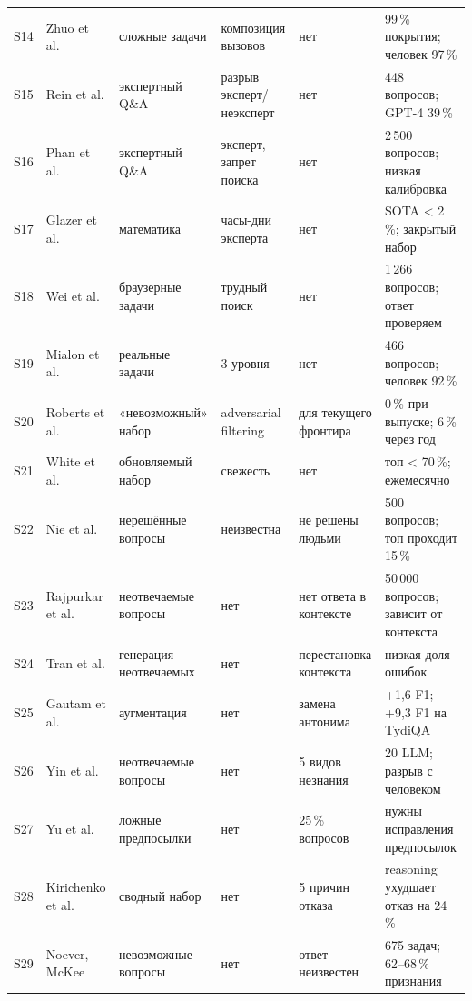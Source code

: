 \documentclass[11pt,a4paper]{article}
\begin{document}
{\begin{longtable}{@{}p{0.65cm}p{2.6cm}p{2.6cm}p{2.9cm}p{2.9cm}p{2.7cm}@{}}
S14 & Zhuo et al. \cite{bigcodebench2024} & сложные задачи & композиция вызовов & нет & 99\,\% покрытия; человек 97\,\% \\
S15 & Rein et al. \cite{gpqa2023} & экспертный Q\&A & разрыв эксперт/неэксперт & нет & 448 вопросов; GPT-4 39\,\% \\
S16 & Phan et al. \cite{hle2025} & экспертный Q\&A & эксперт, запрет поиска & нет & 2\,500 вопросов; низкая калибровка \\
S17 & Glazer et al. \cite{frontiermath2024} & математика & часы-дни эксперта & нет & SOTA < 2\,\%; закрытый набор \\
S18 & Wei et al. \cite{browsecomp2025} & браузерные задачи & трудный поиск & нет & 1\,266 вопросов; ответ проверяем \\
S19 & Mialon et al. \cite{gaia2023} & реальные задачи & 3 уровня & нет & 466 вопросов; человек 92\,\% \\
S20 & Roberts et al. \cite{zerobench2025} & «невозможный» набор & adversarial filtering & для текущего фронтира & 0\,\% при выпуске; 6\,\% через год \\
S21 & White et al. \cite{livebench2024} & обновляемый набор & свежесть & нет & топ < 70\,\%; ежемесячно \\
S22 & Nie et al. \cite{uq2025} & нерешённые вопросы & неизвестна & не решены людьми & 500 вопросов; топ проходит 15\,\% \\
S23 & Rajpurkar et al. \cite{squad2_2018} & неотвечаемые вопросы & нет & нет ответа в контексте & 50\,000 вопросов; зависит от контекста \\
S24 & Tran et al. \cite{agent_unanswerable2023} & генерация неотвечаемых & нет & перестановка контекста & низкая доля ошибок \\
S25 & Gautam et al. \cite{lightweight_unanswerable2023} & аугментация & нет & замена антонима & +1,6 F1; +9,3 F1 на TydiQA \\
S26 & Yin et al. \cite{selfaware2023} & неотвечаемые вопросы & нет & 5 видов незнания & 20 LLM; разрыв с человеком \\
S27 & Yu et al. \cite{crepe2022} & ложные предпосылки & нет & 25\,\% вопросов & нужны исправления предпосылок \\
S28 & Kirichenko et al. \cite{abstentionbench2025} & сводный набор & нет & 5 причин отказа & reasoning ухудшает отказ на 24\,\% \\
S29 & Noever, McKee \cite{impossible_test2024} & невозможные вопросы & нет & ответ неизвестен & 675 задач; 62--68\,\% признания \\

\end{longtable}}
\end{document}
